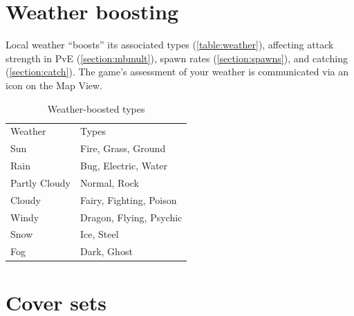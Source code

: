 \section{Weather boosting}
\label{section:weather}
Local weather ``boosts'' its associated types (\autoref{table:weather}), affecting attack strength
 in PvE (\autoref{section:mbmult}),
 spawn rates (\autoref{section:spawns}), and catching (\autoref{section:catch}).
The game's assessment of your weather is communicated via an icon on the Map View.
\begin{table}[ht]
\begin{center}
  \begin{tabular}{ll}
    Weather & Types \\
    \Midrule
    Sun & Fire, Grass, Ground \\
    Rain & Bug, Electric, Water \\
    Partly Cloudy & Normal, Rock \\
    Cloudy & Fairy, Fighting, Poison \\
    Windy & Dragon, Flying, Psychic \\
    Snow & Ice, Steel \\
    Fog & Dark, Ghost \\
  \end{tabular}
  \label{table:weather}
  \caption{Weather-boosted types}
\end{center}
\end{table}

\section{Cover sets}
